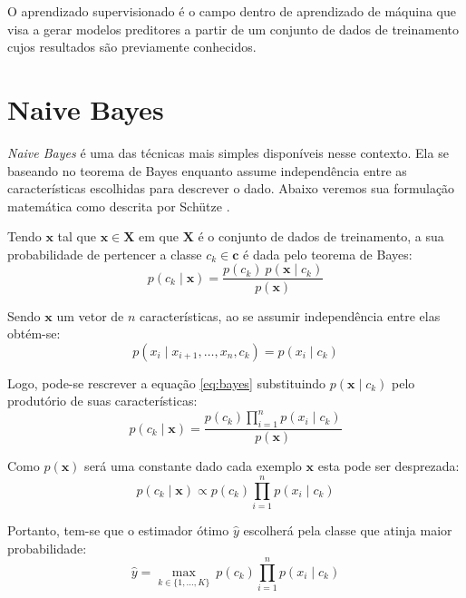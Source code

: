 O aprendizado supervisionado é o campo dentro de aprendizado de máquina que visa a gerar modelos preditores a partir de um conjunto de dados de treinamento cujos resultados são previamente conhecidos.

\section{Naive Bayes}

\textit{Naive Bayes} é uma das técnicas mais simples disponíveis nesse contexto. Ela se baseando no teorema de Bayes enquanto assume independência entre as características escolhidas para descrever o dado. Abaixo veremos sua formulação matemática como descrita por Schütze \cite{schutze08}.

Tendo $\mathbf{x}$ tal que $\mathbf{x} \in \mathbf{X}$ em que $\mathbf{X}$ é o conjunto de dados de treinamento, a sua probabilidade de pertencer a classe $c_k \in \mathbf{c}$ é dada pelo teorema de Bayes:
\begin{equation} \label{eq:bayes}
    p(c_k \mid \mathbf{x}) = \frac{p(c_k) \ p(\mathbf{x} \mid c_k)}{p(\mathbf{x})}
\end{equation}

Sendo $\mathbf{x}$ um vetor de $n$ características, ao se assumir independência entre elas obtém-se:
\begin{equation}
    p(x_i \mid x_{i+1}, \dots ,x_{n}, c_k ) = p(x_i \mid c_k)
\end{equation}

Logo, pode-se rescrever a equação \ref{eq:bayes} substituindo $p(\mathbf{x} \mid c_k)$ pelo produtório de suas características:
\begin{equation}
    p(c_k \mid \mathbf{x}) = \frac{p(c_k) \prod_{i=1}^n p(x_i \mid c_k)}{p(\mathbf{x})}
\end{equation}

Como $p(\mathbf{x})$ será uma constante dado cada exemplo $\mathbf{x}$ esta pode ser desprezada:
\begin{equation}
    p(c_k \mid \mathbf{x}) \propto p(c_k) \prod_{i=1}^n p(x_i \mid c_k)
\end{equation}

Portanto, tem-se que o estimador ótimo $\hat{y}$ escolherá pela classe que atinja maior probabilidade:
\begin{equation}
    \hat{y} = \underset{k \in \{1, \dots, K\}}{\operatorname{max}} \ p(c_k) \displaystyle\prod_{i=1}^n p(x_i \mid c_k)
\end{equation}

